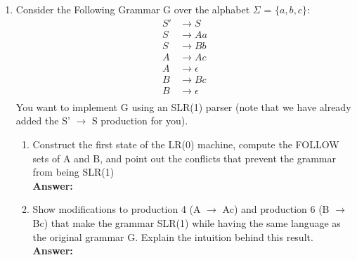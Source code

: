 \documentclass[11pt]{article}
\begin{document}
\begin{enumerate}
    \newpage   
  \item Consider the Following Grammar G over the alphabet $\Sigma$ = $\{a,b,c\}$:
  \begin{equation*}
    \begin{split}
      S' &\to S \\
      S &\to Aa \\
      S &\to Bb \\
      A &\to Ac \\
      A &\to \epsilon\\
      B &\to Bc \\
      B &\to \epsilon \\
    \end{split}
  \end{equation*}
You want to implement G using an SLR(1) parser (note that we have already added the S' $\to$ S production for you). \begin{enumerate}
    \item Construct the first state of the LR(0) machine, compute the FOLLOW sets of A and B, and point out the conflicts that prevent the grammar from being SLR(1) \\
    \textbf{Answer:} 
    
    \newpage
    \item Show modifications to production 4 (A $\to$ Ac) and production 6 (B $\to$ Bc) that make the grammar SLR(1) while having the same language as the original grammar G. Explain the intuition behind this result.\\
    \textbf{Answer:} 
    

\end{enumerate}
\end{enumerate}
\end{document}

